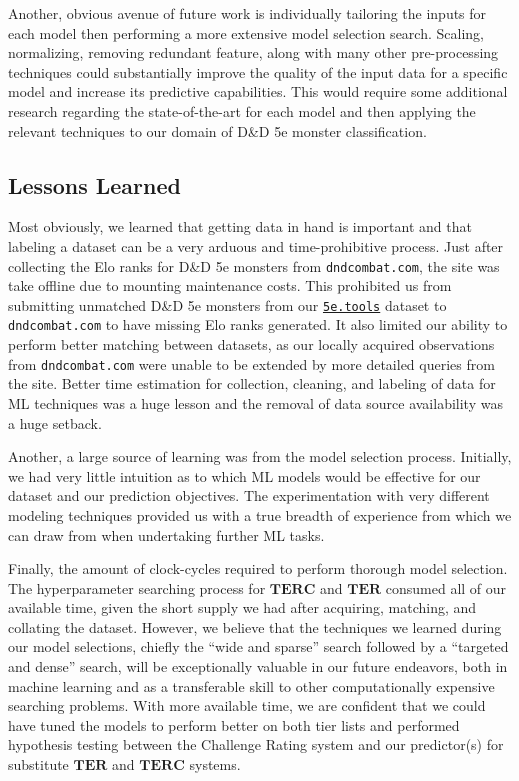 \documentclass{article}
\newcommand{\Qty}[1]{\oldstylenums{#1}}
\newcommand{\TER}{\ensuremath{\mathbf{TER}}\xspace}
\newcommand{\TERC}{\ensuremath{\mathbf{TERC}}\xspace}
\newcommand{\DnD}{D\&D 5e\xspace}
\newcommand{\FiveETools}{\href{https://5etools-mirror-1.github.io/}{\texttt{5e.tools}}\xspace}
\newcommand{\DnDCombat}{\texttt{dndcombat.com}\xspace}
\begin{document}
Another, obvious avenue of future work is individually tailoring the inputs for each model then performing a more extensive model selection search.
Scaling, normalizing, removing redundant feature, along with many other pre-processing techniques could substantially improve the quality of the input data for a specific model and increase its predictive capabilities.
This would require some additional research regarding the state-of-the-art for each model and then applying the relevant techniques to our domain of \DnD monster classification.


\hypertarget{future-work}{%
\subsection{Lessons Learned}}

Most obviously, we learned that getting data in hand is important and that labeling a dataset can be a very arduous  and time-prohibitive process.
Just after collecting the Elo ranks for \DnD monsters from \DnDCombat, the site was take offline due to mounting maintenance costs.
This prohibited us from submitting unmatched \DnD monsters from our \FiveETools dataset to \DnDCombat to have missing Elo ranks generated.
It also limited our ability to perform better matching between datasets, as our locally acquired observations from \DnDCombat were unable to be extended by more detailed queries from the site.
Better time estimation for collection, cleaning, and labeling of data for ML techniques was a huge lesson and the removal of data source availability was a huge setback.

Another, a large source of learning was from the model selection process.
Initially, we had very little intuition as to which ML models would be effective for our dataset and our prediction objectives.
The experimentation with \Qty{10} very different modeling techniques provided us with a true breadth of experience from which we can draw from when undertaking further ML tasks.

Finally, the amount of clock-cycles required to perform thorough model selection.
The hyperparameter searching process for \TERC and \TER consumed all of our available time, given the short supply we had after acquiring, matching, and collating the dataset.
However, we believe that the techniques we learned during our model selections, chiefly the ``wide and sparse'' search followed by a ``targeted and dense'' search, will be exceptionally valuable in our future endeavors, both in machine learning and as a transferable skill to other computationally expensive searching problems.
With more available time, we are confident that we could have tuned the models to perform better on  both tier lists and performed hypothesis testing between the Challenge Rating system and our predictor(s) for substitute \TER and \TERC systems.
\end{document}
